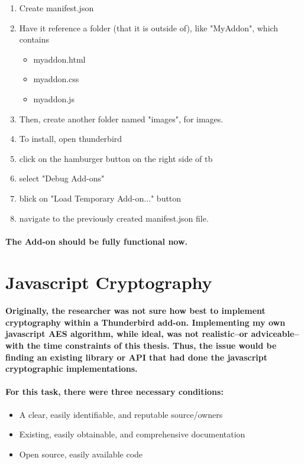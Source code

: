 \begin{enumerate}
\item Create manifest.json
\item Have it reference a folder (that it is outside of), like "MyAddon", which contains
\begin{itemize}
\item myaddon.html
\item myaddon.css
\item myaddon.js
\end{itemize}
\item Then, create another folder named "images", for images.
\item To install, open thunderbird
\item click on the hamburger button on the right side of tb
\item select "Debug Add-ons"
\item blick on "Load Temporary Add-on..." button
\item navigate to the previously created manifest.json file.
\end{enumerate}

\paragraph{The Add-on should be fully functional now.}


\section{Javascript Cryptography}

\paragraph{Originally, the researcher was not sure how best to implement cryptography within a Thunderbird add-on. Implementing my own javascript AES algorithm, while ideal, was not realistic--or adviceable--with the time constraints of this thesis. Thus, the issue would be finding an existing library or API that had done the javascript cryptographic implementations.}

\paragraph{For this task, there were three necessary conditions:}

\begin{itemize}
\item A clear, easily identifiable, and reputable source/owners
\item Existing, easily obtainable, and comprehensive documentation
\item Open source, easily available code
\end{itemize}

